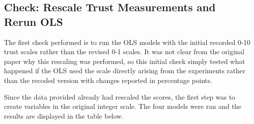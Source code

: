 \documentclass[12pt,letterpaper]{article}
\begin{document}
\subsection{Check: Rescale Trust Measurements and Rerun OLS}
	The first check performed is to run the OLS models with the initial recorded 0-10 trust scales rather than the revised 0-1 scales. It was not clear from the original paper why this rescaling was performed, so this initial check simply tested what happened if the OLS used the scale directly arising from the experiments rather than the recoded version with changes reported in percentage points. 
	 
	Since the data provided already had rescaled the scores, the first step was to create variables in the original integer scale. The four models were ran and the results are displayed in the table below. 
	
	 
\end{document}
